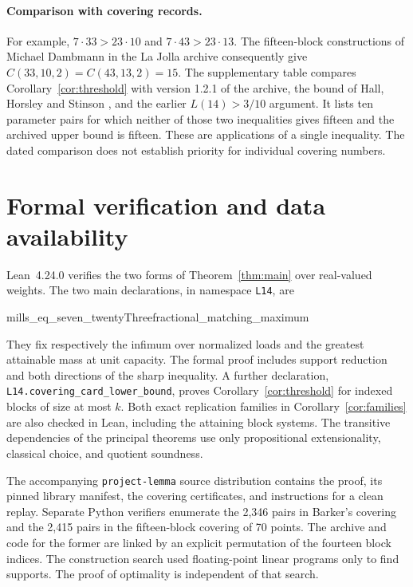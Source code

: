\documentclass[11pt]{article}
\begin{document}
\paragraph{Comparison with covering records.}
For example, \(7\cdot33>23\cdot10\) and \(7\cdot43>23\cdot13\).
The fifteen-block constructions of Michael Dambmann in the La Jolla
archive \cite{gordon} consequently give \(C(33,10,2)=C(43,13,2)=15\).
The supplementary table compares Corollary~\ref{cor:threshold} with
version 1.2.1 of the archive, the bound of Hall, Horsley and Stinson
\cite[Theorem~1.5]{hhs}, and the earlier \(L(14)>3/10\) argument.
It lists ten parameter pairs for which neither of those two inequalities
gives fifteen and the archived upper bound is fifteen. These are
applications of a single inequality. The dated comparison does not
establish priority for individual covering numbers.

\section{Formal verification and data availability}
Lean~4.24.0 verifies the two forms of Theorem~\ref{thm:main} over
real-valued weights. The two main declarations, in namespace
\texttt{L14}, are
\begin{center}\small\ttfamily
mills\_eq\_seven\_twentyThree\qquad fractional\_matching\_maximum
\end{center}
\noindent
They fix respectively the infimum over normalized loads and the greatest
attainable mass at unit capacity. The formal proof includes support
reduction and both directions of the sharp inequality. A further
declaration, \texttt{L14.covering\_card\_lower\_bound}, proves
Corollary~\ref{cor:threshold} for indexed blocks of size at most \(k\).
Both exact replication families in Corollary~\ref{cor:families} are
also checked in Lean, including the attaining block systems.
The transitive dependencies of the principal theorems use only
propositional extensionality, classical choice, and quotient soundness.

The accompanying \texttt{project-lemma} source distribution contains
the proof, its pinned library manifest, the covering certificates, and
instructions for a clean replay. Separate Python verifiers enumerate
the 2,346 pairs in Barker's covering and the 2,415 pairs in the
fifteen-block covering of 70 points. The archive and code for the former
are linked by an explicit permutation of the fourteen block indices.
The construction search used floating-point linear programs only to
find supports. The proof of optimality is independent of that search.
\end{document}
